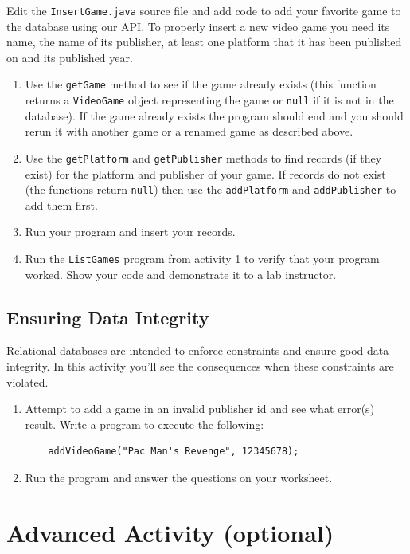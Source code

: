 \documentclass[12pt]{scrartcl}
\begin{document}
Edit the \texttt{InsertGame.java} source file and add code 
to add your favorite game to the database using our API.  To properly 
insert a new video game you need its name, the name of its publisher, 
at least one platform that it has been published on and its published 
year.
\begin{enumerate}
  \item Use the \texttt{getGame} method to see if the game 
  	already exists (this function returns a \texttt{VideoGame} 
	object representing the game or \texttt{null} if it is not 
	in the database).  If the game already exists the program should 
	end and you should rerun it with another game or a renamed 
	game as described above.
  \item Use the \texttt{getPlatform} and \texttt{getPublisher} 
	methods to find records (if they exist) for the platform and publisher 
	of your game.  If records do not exist (the functions return \texttt{null}) 
	then use the \texttt{addPlatform} and \texttt{addPublisher} 
	to add them first.
  \item Run your program and insert your records.
  \item Run the \texttt{ListGames} program from activity 1 to 
  	verify that your program worked.  Show your code and demonstrate 
	it to a lab instructor.
\end{enumerate}

\subsection{Ensuring Data Integrity}

Relational databases are intended to enforce constraints and ensure 
good data integrity.  In this activity you'll see the consequences when 
these constraints are violated.
\begin{enumerate}
  \item Attempt to add a game in an invalid publisher id and see what 
	error(s) result.  Write a program to execute the following:
	
	\begin{verbatim}
	addVideoGame("Pac Man's Revenge", 12345678);
	\end{verbatim}
  \item Run the program and answer the questions on your worksheet.
\end{enumerate}

\section{Advanced Activity (optional)}
\end{document}
